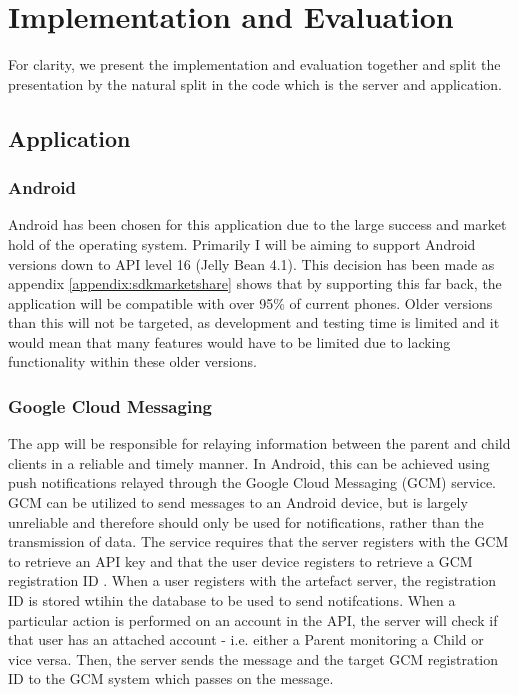 \chapter{Implementation and Evaluation}

For clarity, we present the implementation and evaluation together and split the presentation by the natural split in the code which is the server and application.

\section{Application}
\subsection{Android}
Android has been chosen for this application due to the large success and market hold of the operating system.
Primarily I will be aiming to support Android versions down to API level 16 (Jelly Bean 4.1).
This decision has been made as appendix \ref{appendix:sdkmarketshare} shows that by supporting this far back, the application will be compatible with over 95\% of current phones. 
Older versions than this will not be targeted, as development and testing time is limited and it would mean that many features would have to be limited due to lacking functionality within these older versions.

\subsection{Google Cloud Messaging}
The app will be responsible for relaying information between the parent and child clients in a reliable and timely manner.
In Android, this can be achieved using push notifications relayed through the Google Cloud Messaging (GCM) service.
GCM can be utilized to send messages to an Android device, but is largely unreliable \citep{gcmreliability} and therefore should only be used for notifications, rather than the transmission of data.
The service requires that the server registers with the GCM to retrieve an API key and that the user device registers to retrieve a GCM registration ID \citep{gcm}. 
When a user registers with the artefact server, the registration ID is stored wtihin the database to be used to send notifcations.
When a particular action is performed on an account in the API, the server will check if that user has an attached account - i.e. either a Parent monitoring a Child or vice versa.
Then, the server sends the message and the target GCM registration ID to the GCM system which passes on the message.

